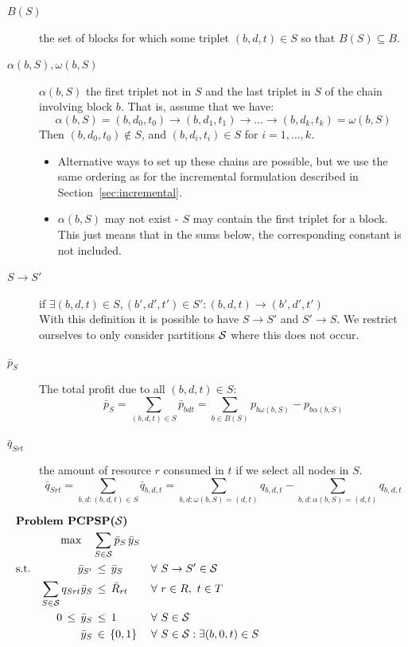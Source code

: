 \documentclass[authoryear,11pt,square,number,times,super,comma]{elsarticle}
\def\by{\bar{y}}
\begin{document}
\begin{description}
\item[$B(S)$] the set of blocks for which some triplet $(b,d,t)\in S$ so that
  $B(S)\subseteq B$.
\item[$\alpha(b,S),\omega(b,S)$] $\alpha(b,S)$ the first triplet not in $S$
  and the last triplet in $S$ of the chain involving block $b$. That is, assume
  that we have:
  $$\alpha(b,S)=(b,d_0,t_0)\rightarrow (b,d_1,t_1) \rightarrow \ldots
  \rightarrow (b,d_k,t_k)=\omega(b,S)$$
  Then $(b,d_0,t_0)\not\in S$, and $(b,d_i,t_i)\in S$ for $i=1,\ldots,k$.
  \begin{itemize}
  \item Alternative ways to set up these chains are possible, but we use the same ordering as for the incremental formulation described in Section~\ref{sec:incremental}.
  \item $\alpha(b,S)$ may not exist - $S$ may contain the first triplet for a
  block. This just means that in the sums below, the corresponding constant is
  not included.
  \end{itemize}
\item[$S\rightarrow S'$] if $\exists (b,d,t)\in S,(b',d',t')\in S' :
  (b,d,t)\rightarrow(b',d',t') $\\
  With this definition it is possible to have $S\rightarrow S'$ and
  $S'\rightarrow S$. We restrict ourselves to only consider partitions $\cal S$ where this does not occur. 
\item[$\bar p_{S}$] The total profit due to all $(b,d,t)\in S$:
  $$\bar p_{S}=\sum_{(b,d,t)\in S} \bar p_{bdt}
  = \sum_{b\in B(S)} p_{b\omega(b,S)} - p_{b\alpha(b,S)}
  $$
\item[$\bar q_{Srt}$] the amount of resource $r$ consumed in $t$ if we select
  all nodes in $S$.
  $$\bar q_{Srt}=\sum_{b,d:(b,d,t)\in S} \bar q_{b,d,t}
  =\sum_{b,d:\omega(b,S)=(d,t)} q_{b,d,t} - \sum_{b,d:\alpha(b,S)=(d,t)} q_{b,d,t}$$
\end{description}
\begin{alignat}{3}   %
  \noalign{\noindent\bf Problem PCPSP($\mathcal{S}$)}
  &&\max\quad&\sum_{S\in \mathcal{S}} \bar p_{S}\,\by_S   & \label{eq:Sobj}\\
  \text{s.t.} && \by_{S'} &\,\leq\, \by_{S}&&
  \forall\ S\rightarrow S'\in\mathcal{S} \label{eq:Sprec}\\ 
  &&\sum_{S\in\mathcal{S}} q_{Srt}\by_S&\,\leq\, \bar R_{rt}&&\forall\  r\in R,\ t\in T\label{eq:Sresource}\\
  && 0\,\leq\, \by_{S}&\,\leq\, 1  &&\forall\ S\in\mathcal{S} \label{eq:Svars}\\
  && \by_S&\,\in\,\{0,1\}&&\forall\ S\in\mathcal{S}:\exists (b,0,t)\in S
\end{alignat}
\end{document}
